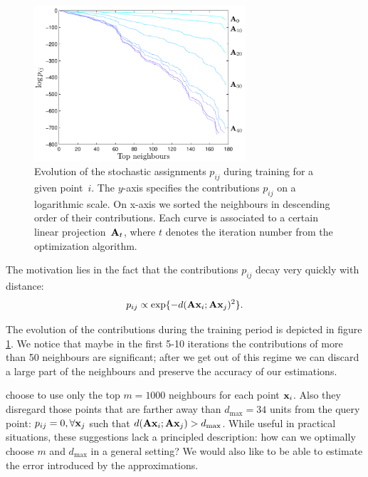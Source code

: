 \begin{figure}
	\centering\includegraphics[width=0.7\textwidth]{images/contributions}
	\caption[Evolution of the stochastic assignments $p_{ij}$ during training]{Evolution of the stochastic assignments $p_{ij}$ during training for a given point~$i$. The $y$-axis specifies the contributions $p_{ij}$ on a logarithmic scale. On x-axis we sorted the neighbours in descending order of their contributions. Each curve is associated to a certain linear projection~$\mathbf{A}_t$, where $t$ denotes the iteration number from the optimization algorithm.}
	\label{fig:contributions}
\end{figure}

The motivation lies in the fact that the contributions $p_{ij}$ decay very
quickly with distance:
 \[
 	p_{ij} \propto \exp\{-d(\mathbf{A}\mathbf{x}_i;\mathbf{A}\mathbf{x}_j)^2\}.
 \] 
 
The evolution of the contributions during the training period is depicted in
figure \ref{fig:contributions}. We notice that maybe in the first 5-10 iterations the contributions of more than 50 neighbours are significant; after we get out of this regime we can discard a large part of the neighbours and preserve the
accuracy of our estimations. 

\citet{weinberger2007} choose to use only the top $m = 1000$ neighbours for
each point $\mathbf{x}_i$. Also they disregard those points that are farther away than
$d_{\max}=34$ units from the query point: $p_{ij} = 0, \forall \mathbf{x}_j$ such that
$d(\mathbf{A}\mathbf{x}_i;\mathbf{A}\mathbf{x}_j)>d_{\max}$. While useful in practical situations, these
suggestions lack a principled description: how can we optimally choose $m$
and $d_{\max}$ in a general setting? We would also like to be able to estimate
the error introduced by the approximations.

